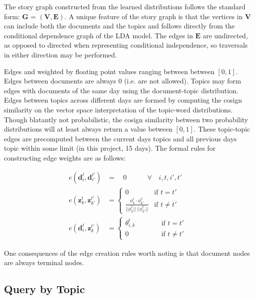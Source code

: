 \documentclass[10pt,twocolumn]{article}
\begin{document}
The story graph constructed from the learned distributions follows the standard form: $\mathbf{G}$ = $(\mathbf{V}, \mathbf{E})$.  A unique feature of the story graph is that the vertices in $\mathbf{V}$ can include both the documents and the topics and follows directly from the conditional dependence graph of the LDA model.  The edges in $\mathbf{E}$ are undirected, as opposed to directed when representing conditional independence, so traversals in either direction may be performed.  

Edges and weighted by floating point values ranging between between $[0, 1]$.  Edges between documents are always 0 (i.e. are not allowed).  Topics may form edges with documents of the same day using the document-topic distribution.  Edges between topics across different days are formed by computing the cosign similarity on the vector space interpretation of the topic-word distributions.  Though blatantly not probabilistic, the cosign similarity between two probability distributions will at least always return a value between $[0,1]$. These topic-topic edges are precomputed between the current days topics and all previous days topic within some limit (in this project, 15 days).  The formal rules for constructing edge weights are as follows:  

\begin{align*}
  e(\mathbf{d}_i^t, \mathbf{d}_{i'}^{t'}) &= \quad 0 \qquad\quad \forall \quad i, t, i', t'\\
  e(\mathbf{z}_k^t, \mathbf{z}_{k'}^{t'}) &= \begin{cases}
      0 & \text{if $t=t'$} \\
      \frac{\phi_k^t \cdot \phi_{k'}^{t'}}{||\phi_k^t||\,||\phi_{k'}^{t'}||} & \text{if $t \ne t'$}
    \end{cases} \\
  e(\mathbf{d}_i^t, \mathbf{z}_{k}^{t'}) &= \begin{cases}
      \theta_{i,k}^t & \qquad\quad \text{if $t =t'$} \\
      0 & \qquad\quad \text{if $t \ne t'$}
    \end{cases}
\end{align*}

One consequences of the edge creation rules worth noting is that document nodes are always terminal nodes.

\subsection {Query by Topic}
\end{document}
